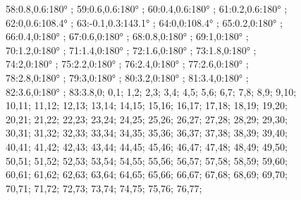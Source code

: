 \documentclass[a4paper,10pt,ngerman]{scrartcl}
\begin{document}
\begin{algorithm}[H]
\begin{figure}[!h]
{                58:0.8,0.6:180° ;
                59:0.6,0.6:180° ;
                60:0.4,0.6:180° ;
                61:0.2,0.6:180° ;
                62:0,0.6:108.4° ;
                63:-0.1,0.3:143.1° ;
                64:0,0:108.4° ;
                65:0.2,0:180° ;
                66:0.4,0:180° ;
                67:0.6,0:180° ;
                68:0.8,0:180° ;
                69:1,0:180° ;
                70:1.2,0:180° ;
                71:1.4,0:180° ;
                72:1.6,0:180° ;
                73:1.8,0:180° ;
                74:2,0:180° ;
                75:2.2,0:180° ;
                76:2.4,0:180° ;
                77:2.6,0:180° ;
                78:2.8,0:180° ;
                79:3,0:180° ;
                80:3.2,0:180° ;
                81:3.4,0:180° ;
                82:3.6,0:180° ;
                83:3.8,0;
            }{
                0,1;
                1,2;
                2,3;
                3,4;
                4,5;
                5,6;
                6,7;
                7,8;
                8,9;
                9,10;
                10,11;
                11,12;
                12,13;
                13,14;
                14,15;
                15,16;
                16,17;
                17,18;
                18,19;
                19,20;
                20,21;
                21,22;
                22,23;
                23,24;
                24,25;
                25,26;
                26,27;
                27,28;
                28,29;
                29,30;
                30,31;
                31,32;
                32,33;
                33,34;
                34,35;
                35,36;
                36,37;
                37,38;
                38,39;
                39,40;
                40,41;
                41,42;
                42,43;
                43,44;
                44,45;
                45,46;
                46,47;
                47,48;
                48,49;
                49,50;
                50,51;
                51,52;
                52,53;
                53,54;
                54,55;
                55,56;
                56,57;
                57,58;
                58,59;
                59,60;
                60,61;
                61,62;
                62,63;
                63,64;
                64,65;
                65,66;
                66,67;
                67,68;
                68,69;
                69,70;
                70,71;
                71,72;
                72,73;
                73,74;
                74,75;
                75,76;
                76,77;
}
\end{figure}
\end{algorithm}
\end{document}
